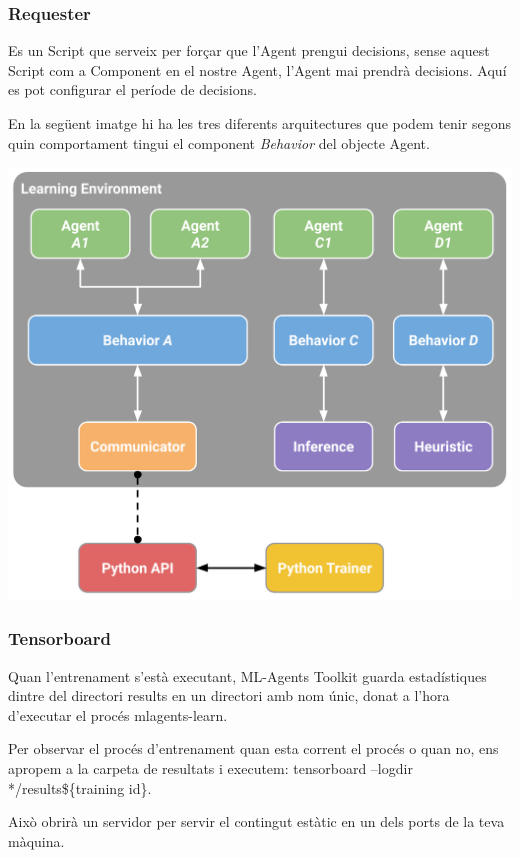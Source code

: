 \documentclass{article}
\begin{document}
    \subsubsection{Requester}
    Es un Script que serveix per forçar que l’Agent prengui decisions, sense aquest Script com a Component en el nostre Agent, l’Agent mai prendrà decisions. Aquí es pot configurar el període de decisions.
    
    
    En la següent imatge hi ha les tres diferents arquitectures que podem tenir segons quin comportament tingui el component \textit{Behavior} del objecte Agent.
    
    \includegraphics[width=\textwidth]{images/arquitecture_mlagent.png}
    
    \newpage
    
    \subsubsection{Tensorboard}
    Quan l’entrenament s’està executant, ML-Agents Toolkit guarda estadístiques dintre del directori results en un directori amb nom únic, donat a l’hora d’executar el procés mlagents-learn.
    
    Per observar el procés d’entrenament quan esta corrent el procés o quan no, ens apropem a la carpeta de resultats i executem: tensorboard –logdir */results\$\{training id\}.
    
    Això obrirà un servidor per servir el contingut estàtic en un dels ports de la teva màquina.
    
\end{document}
